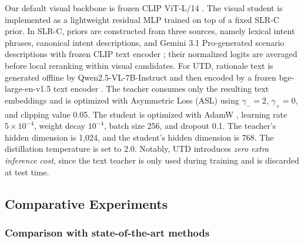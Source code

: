 Our default visual backbone is frozen CLIP ViT-L/14 \cite{radford_learning_2021}. The visual student is implemented as a lightweight residual MLP trained on top of a fixed SLR-C prior. In SLR-C, priors are constructed from three sources, namely lexical intent phrases, canonical intent descriptions, and Gemini 3.1 Pro-generated scenario descriptions \cite{team_gemini_2025} with frozen CLIP text encoder \cite{radford_learning_2021}; their normalized logits are averaged before local reranking within  visual candidates. For UTD, rationale text is generated offline by Qwen2.5-VL-7B-Instruct \cite{bai_qwen25-vl_2025} and then encoded by a frozen bge-large-en-v1.5 text encoder \cite{xiao_c-pack_2024}.  The teacher consumes only the resulting text embeddings and is optimized with Asymmetric Loss (ASL) \cite{ridnik_asymmetric_2021} using $\gamma_{-}=2$, $\gamma_{+}=0$, and clipping value 0.05. The student is optimized with AdamW \cite{loshchilov_decoupled_2018}, learning rate $5\times10^{-4}$, weight decay $10^{-4}$, batch size 256, and dropout 0.1. The teacher's hidden dimension is 1,024, and the student's hidden dimension is 768. The distillation temperature is set to 2.0.  Notably, UTD introduces \emph{zero extra inference cost}, since the text teacher is only used during training and is discarded at test time.

\subsection{Comparative Experiments}

\subsubsection{Comparison with state-of-the-art methods}

